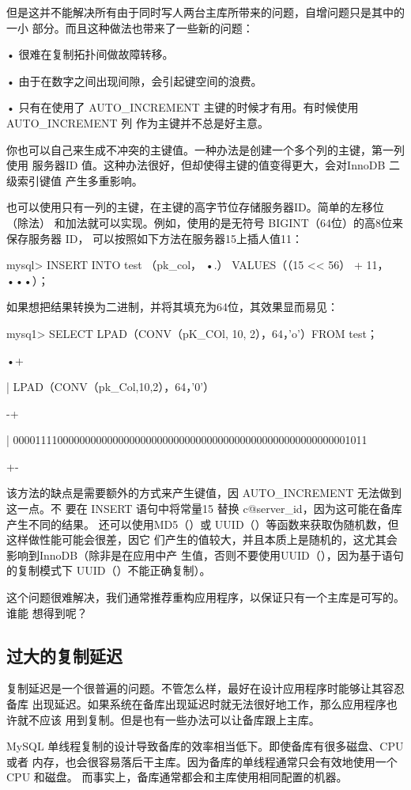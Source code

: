 但是这并不能解决所有由于同时写人两台主库所带来的问题，自增问题只是其中的一小
部分。而且这种做法也带来了一些新的问题：

• 很难在复制拓扑间做故障转移。

• 由于在数字之间出现间隙，会引起键空间的浪费。

• 只有在使用了 AUTO\_INCREMENT 主键的时候才有用。有时候使用 AUTO\_INCREMENT 列
作为主键并不总是好主意。

你也可以自己来生成不冲突的主键值。一种办法是创建一个多个列的主键，第一列使用
服务器ID 值。这种办法很好，但却使得主键的值变得更大，会对InnoDB 二级索引键值
产生多重影响。

也可以使用只有一列的主键，在主键的高字节位存储服务器ID。简单的左移位（除法）
和加法就可以实现。例如，使用的是无符号 BIGINT（64位）的高8位来保存服务器 ID，
可以按照如下方法在服务器15上插人值11：

mysql> INSERT INTO test （pk\_col， •.） VALUES（（15 << 56） + 11，•••）；

如果想把结果转换为二进制，并将其填充为64位，其效果显而易见：

mysq1> SELECT LPAD（CONV（pK\_COl, 10, 2），64，'o'）FROM test；

•+

| LPAD（CONV（pk\_Col,10,2），64，'0'）

-+

| 0000111100000000000000000000000000000000000000000000000000001011

+-

该方法的缺点是需要额外的方式来产生键值，因 AUTO\_INCREMENT 无法做到这一点。不
要在 INSERT 语句中将常量15 替换 c@server\_id，因为这可能在备库产生不同的结果。
还可以使用MD5（）或 UUID（）等函数来获取伪随机数，但这样做性能可能会很差，因它
们产生的值较大，并且本质上是随机的，这尤其会影响到InnoDB（除非是在应用中产
生值，否则不要使用UUID（），因为基于语句的复制模式下 UUID（）不能正确复制）。

这个问题很难解决，我们通常推荐重构应用程序，以保证只有一个主库是可写的。谁能
想得到呢？

\subsection{过大的复制延迟}
复制延迟是一个很普遍的问题。不管怎么样，最好在设计应用程序时能够让其容忍备库
出现延迟。如果系统在备库出现延迟时就无法很好地工作，那么应用程序也许就不应该
用到复制。但是也有一些办法可以让备库跟上主库。

MySQL 单线程复制的设计导致备库的效率相当低下。即使备库有很多磁盘、CPU 或者
内存，也会很容易落后干主库。因为备库的单线程通常只会有效地使用一个 CPU 和磁盘。
而事实上，备库通常都会和主库使用相同配置的机器。

